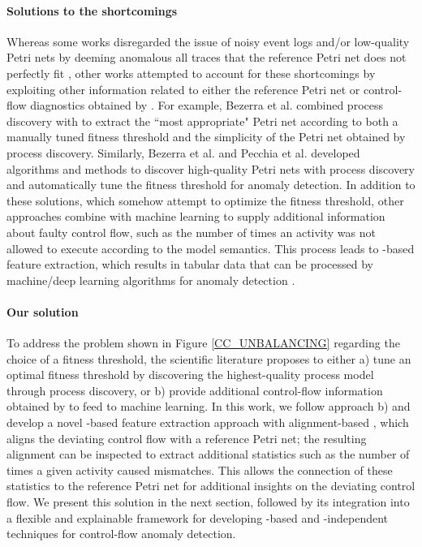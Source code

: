 \paragraph{Solutions to the shortcomings}
Whereas some works disregarded the issue of noisy event logs and/or low-quality Petri nets by deeming anomalous all traces that the reference Petri net does not perfectly fit \cite{accorsi2012pmsecurityaudits, myers2018icsadpm}, other works attempted to account for these shortcomings by exploiting other information related to either the reference Petri net or control-flow diagnostics obtained by . For example, Bezerra et al. \cite{bezerra2009pmad} combined process discovery with  to extract the ``most appropriate" Petri net according to both a manually tuned fitness threshold and the simplicity of the Petri net obtained by process discovery. Similarly, Bezerra et al. \cite{bezerra2013adlogspais} and Pecchia et al. \cite{pecchia2020applicationfailuresanalysispm} developed algorithms and methods to discover high-quality Petri nets with process discovery and automatically tune the fitness threshold for anomaly detection. In addition to these solutions, which somehow attempt to optimize the fitness threshold, other approaches combine  with machine learning to supply additional information about faulty control flow, such as the number of times an activity was not allowed to execute according to the model semantics. This process leads to  -based feature extraction, which results in tabular data that can be processed by machine/deep learning algorithms for anomaly detection \cite{sarno2020pmadbp, singh2022lapmsh, debenedictis2023dtadiiot}.

\paragraph{Our solution} To address the problem shown in Figure \ref{CC_UNBALANCING} regarding the choice of a fitness threshold, the scientific literature proposes to either a) tune an optimal fitness threshold by discovering the highest-quality process model through process discovery, or b) provide additional control-flow information obtained by  to feed to machine learning. In this work, we follow approach b) and develop a novel -based feature extraction approach with alignment-based , which aligns the deviating control flow with a reference Petri net; the resulting alignment can be inspected to extract additional statistics such as the number of times a given activity caused mismatches. This allows the connection of these statistics to the reference Petri net for additional insights on the deviating control flow. We present this solution in the next section, followed by its integration into a flexible and explainable framework for developing -based and -independent techniques for control-flow anomaly detection.

